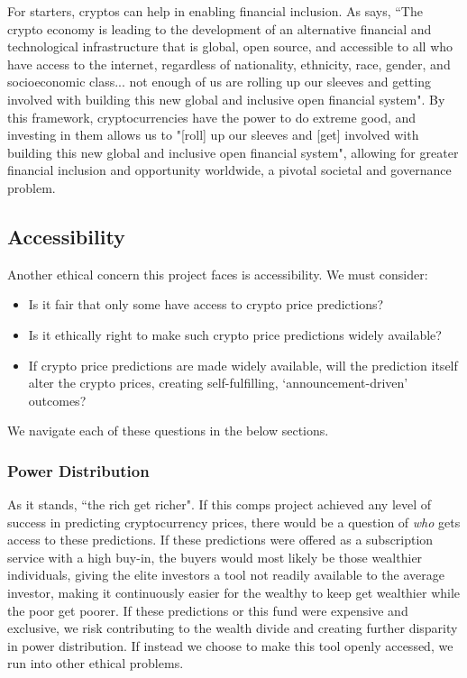 \documentclass[10pt,twocolumn]{article}
\begin{document}
For starters, cryptos can help in enabling financial inclusion. As  says, ``The crypto economy is leading to the development of an alternative financial and technological infrastructure that is global, open source, and accessible to all who have access to the internet, regardless of nationality, ethnicity, race, gender, and socioeconomic class... not enough of us are rolling up our sleeves and getting involved with building this new global and inclusive open financial system". By this framework, cryptocurrencies have the power to do extreme good, and investing in them allows us to "[roll] up our sleeves and [get] involved with building this new global and inclusive open financial system", allowing for greater financial inclusion and opportunity worldwide, a pivotal societal and governance problem.


\subsection{Accessibility}

Another ethical concern this project faces is accessibility. We must consider:

\begin{itemize}
    \item Is it fair that only some have access to crypto price predictions?
    \item Is it ethically right to make such crypto price predictions widely available?
    \item If crypto price predictions are made widely available, will the prediction itself alter the crypto prices, creating self-fulfilling, `announcement-driven' outcomes?
\end{itemize}

We navigate each of these questions in the below sections.

\subsubsection{Power Distribution}

As it stands, ``the rich get richer". If this comps project achieved any level of success in predicting cryptocurrency prices, there would be a question of \textit{who} gets access to these predictions. If these predictions were offered as a subscription service with a high buy-in, the buyers would most likely be those wealthier individuals, giving the elite investors a tool not readily available to the average investor, making it continuously easier for the wealthy to keep get wealthier while the poor get poorer. If these predictions or this fund were expensive and exclusive, we risk contributing to the wealth divide and creating further disparity in power distribution. If instead we choose to make this tool openly accessed, we run into other ethical problems.
\end{document}

